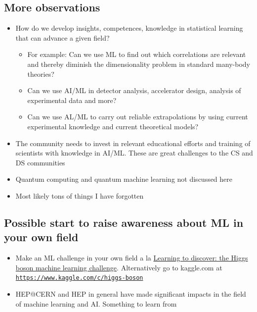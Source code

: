 \documentclass[%
oneside,                 %
final,                   %
10pt]{article}
\begin{document}
\subsection{More observations}
\begin{block}{}
\begin{itemize}
\item How do we develop insights, competences, knowledge in statistical learning that can advance a given field?
\begin{itemize}

  \item For example: Can we use ML to find out which correlations are relevant and thereby diminish the dimensionality problem in standard many-body  theories?

  \item Can we use AI/ML in detector analysis, accelerator design, analysis of experimental data and more?

  \item Can we use AL/ML to carry out reliable extrapolations by using current experimental knowledge and current theoretical models?

\end{itemize}

\noindent
\item The community needs to invest in relevant educational efforts and training of scientists with knowledge in AI/ML. These are great challenges to the CS and DS communities

\item Quantum computing and quantum machine learning not discussed here

\item Most likely tons of things I have forgotten
\end{itemize}

\noindent
\end{block}

\subsection{Possible start to raise awareness about ML in your own field}
\begin{block}{}
\begin{itemize}
\item Make an ML challenge in your own field a la \href{{https://home.cern/news/news/computing/higgs-boson-machine-learning-challenge}}{Learning to discover: the Higgs boson machine learning challenge}. Alternatively go to kaggle.com at \href{{https://www.kaggle.com/c/higgs-boson}}{\nolinkurl{https://www.kaggle.com/c/higgs-boson}}

\item HEP@CERN and HEP in general have made significant impacts in the field of machine learning and AI. Something to learn from
\end{itemize}

\noindent
\end{block}
\end{document}
